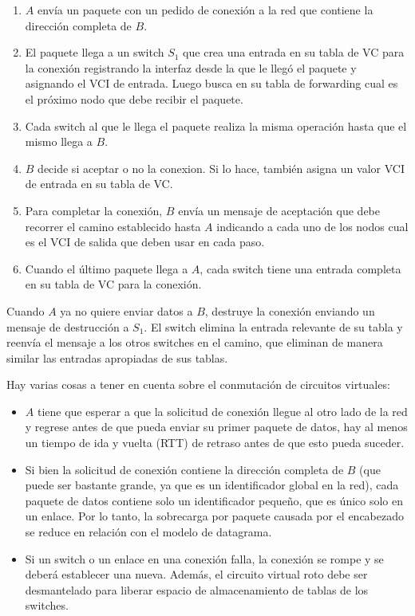  \begin{enumerate}
  \item \(A\) envía un paquete con un pedido de conexión a la red que contiene la dirección completa de \(B\).
  \item El paquete llega a un switch \(S_1\) que crea una entrada en su tabla de VC para la conexión registrando la interfaz desde la que le llegó el paquete y asignando el VCI de entrada. Luego busca en su tabla de forwarding cual es el próximo nodo que debe recibir el paquete.
  \item Cada switch al que le llega el paquete realiza la misma operación hasta que el mismo llega a \(B\).
  \item \(B\) decide si aceptar o no la conexion. Si lo hace, también asigna un valor VCI de entrada en su tabla de VC.
  \item Para completar la conexión, \(B\) envía un mensaje de aceptación que debe recorrer el camino establecido hasta \(A\) indicando a cada uno de los nodos cual es el VCI de salida que deben usar en cada paso.
  \item Cuando el último paquete llega a \(A\), cada switch tiene una entrada completa en su tabla de VC para la conexión.
  \end{enumerate}

Cuando \(A\) ya no quiere enviar datos a \(B\), destruye la conexión enviando un mensaje de destrucción a \(S_1\). El switch elimina la entrada relevante de su tabla y reenvía el mensaje a los otros switches en el camino, que eliminan de manera similar las entradas apropiadas de sus tablas.

Hay varias cosas a tener en cuenta sobre el conmutación de circuitos virtuales:
\begin{itemize}
  \item \(A\) tiene que esperar a que la solicitud de conexión llegue al otro lado de la red y regrese antes de que pueda enviar su primer paquete de datos, hay al menos un tiempo de ida y vuelta (RTT) de retraso antes de que esto pueda suceder.
  \item Si bien la solicitud de conexión contiene la dirección completa de \(B\) (que puede ser bastante grande, ya que es un identificador global en la red), cada paquete de datos contiene solo un identificador pequeño, que es único solo en un enlace. Por lo tanto, la sobrecarga por paquete causada por el encabezado se reduce en relación con el modelo de datagrama.
  \item Si un switch o un enlace en una conexión falla, la conexión se rompe y se deberá establecer una nueva. Además, el circuito virtual roto debe ser desmantelado para liberar espacio de almacenamiento de tablas de los switches.
\end{itemize}

